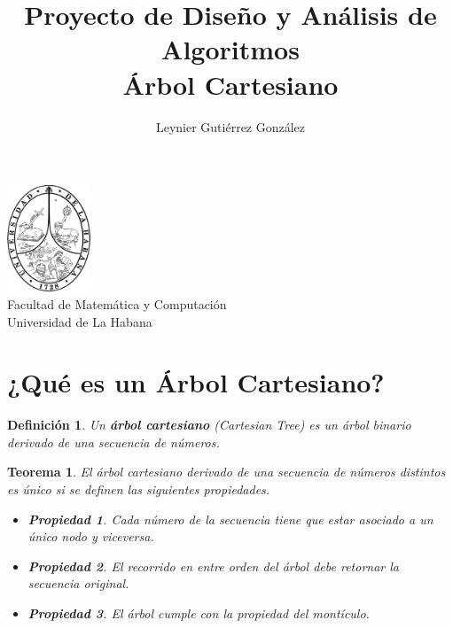 \documentclass[12pt]{article}
\title{Proyecto de Diseño y Análisis de Algoritmos\\ \vspace{.2cm} \textbf{Árbol Cartesiano}}
\author{Leynier Gutiérrez González}
\newcommand{\nl}{\vspace{0.3cm}}
\newcommand{\ct}{árbol cartesiano }
\newtheorem{theorem}{Teorema}
\newtheorem{definition}{Definición}
\newtheorem{propertie}{Propiedad}
\begin{document}
\maketitle

\vspace{0.5cm}

\begin{center}
	\vspace{0.2cm}
	\includegraphics[width=2.5cm]{images/escudo.png}\\
	\vspace{0.2cm}
	Facultad de Matemática y Computación\\
	\vspace{0.1cm}
	Universidad de La Habana\\
	\vspace{1cm}
\end{center}

\vspace{1cm}

\begin{abstract}
	
\end{abstract}

\newpage

\tableofcontents

\newpage

\section{¿Qué es un Árbol Cartesiano?}

\nl

\begin{definition}
	Un \textbf{\ct}(Cartesian Tree) es un árbol binario derivado de una secuencia de números.
\end{definition}

\begin{theorem}
	El \ct derivado de una secuencia de números distintos es único si se definen las siguientes propiedades.
	\begin{itemize}
		\item \begin{propertie} Cada número de la secuencia tiene que estar asociado a un único nodo y viceversa. \end{propertie}
		\item \begin{propertie} El recorrido en entre orden del árbol debe retornar la secuencia original. \end{propertie}
		\item \begin{propertie} El árbol cumple con la propiedad del montículo. \end{propertie}
	\end{itemize}
\end{theorem}
\end{document}
